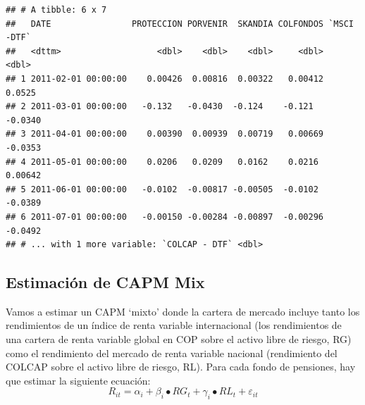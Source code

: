 \documentclass[
  12pt,
]{article}
\newenvironment{Shaded}{\begin{snugshade}}{\end{snugshade}}
\newcommand{\AttributeTok}[1]{\textcolor[rgb]{0.77,0.63,0.00}{#1}}
\newcommand{\DecValTok}[1]{\textcolor[rgb]{0.00,0.00,0.81}{#1}}
\newcommand{\FunctionTok}[1]{\textcolor[rgb]{0.00,0.00,0.00}{#1}}
\newcommand{\NormalTok}[1]{#1}
\newcommand{\OtherTok}[1]{\textcolor[rgb]{0.56,0.35,0.01}{#1}}
\newcommand{\SpecialCharTok}[1]{\textcolor[rgb]{0.00,0.00,0.00}{#1}}
\newcommand{\StringTok}[1]{\textcolor[rgb]{0.31,0.60,0.02}{#1}}
\begin{document}
\begin{verbatim}
## # A tibble: 6 x 7
##   DATE                PROTECCION PORVENIR  SKANDIA COLFONDOS `MSCI -DTF`
##   <dttm>                   <dbl>    <dbl>    <dbl>     <dbl>       <dbl>
## 1 2011-02-01 00:00:00    0.00426  0.00816  0.00322   0.00412     0.0525 
## 2 2011-03-01 00:00:00   -0.132   -0.0430  -0.124    -0.121      -0.0340 
## 3 2011-04-01 00:00:00    0.00390  0.00939  0.00719   0.00669    -0.0353 
## 4 2011-05-01 00:00:00    0.0206   0.0209   0.0162    0.0216      0.00642
## 5 2011-06-01 00:00:00   -0.0102  -0.00817 -0.00505  -0.0102     -0.0389 
## 6 2011-07-01 00:00:00   -0.00150 -0.00284 -0.00897  -0.00296    -0.0492 
## # ... with 1 more variable: `COLCAP - DTF` <dbl>
\end{verbatim}

\begin{Shaded}
\end{Shaded}

\hypertarget{estimaciuxf3n-de-capm-mix}{%
\subsection{Estimación de CAPM Mix}\label{estimaciuxf3n-de-capm-mix}}

Vamos a estimar un CAPM `mixto' donde la cartera de mercado incluye
tanto los rendimientos de un índice de renta variable internacional (los
rendimientos de una cartera de renta variable global en COP sobre el
activo libre de riesgo, RG) como el rendimiento del mercado de renta
variable nacional (rendimiento del COLCAP sobre el activo libre de
riesgo, RL). Para cada fondo de pensiones, hay que estimar la siguiente
ecuación: \[
R_{it}=\alpha_i+\beta_i\bullet{RG}_t+\gamma_i\bullet{RL}_t+\varepsilon_{it}
\]
\end{document}
